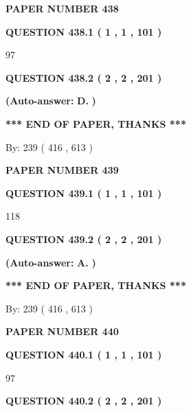 \documentclass[12pt]{article}
\begin{document}
   
\newpage 
\setcounter{page}{ 
   438001 } 
   
   
 {\textbf{ \Large{ PAPER NUMBER  438  }}}
   
   
   
   
  
  
{\textbf{\large{QUESTION
438.1 
 ( 1 , 1 , 101 )
}}}

97
  
  
{\textbf{\large{QUESTION
438.2 
 ( 2 , 2 , 201 )
}}}
 
 
{\textbf{(Auto-answer:}}
{\textbf{\large{
D.}}}
{\textbf{)}}
 
 
   
   
   
   
\vspace{1.0in} 
{\textbf{\large{ *** END OF PAPER, THANKS *** }}} 
   
   
\hspace{1.0in} By: 
 239 ( 416 ,  613 )
   
   
   
   
\newpage 
\setcounter{page}{ 
   439001 } 
   
   
 {\textbf{ \Large{ PAPER NUMBER  439  }}}
   
   
   
   
  
  
{\textbf{\large{QUESTION
439.1 
 ( 1 , 1 , 101 )
}}}

118
  
  
{\textbf{\large{QUESTION
439.2 
 ( 2 , 2 , 201 )
}}}
 
 
{\textbf{(Auto-answer:}}
{\textbf{\large{
A.}}}
{\textbf{)}}
 
 
   
   
   
   
\vspace{1.0in} 
{\textbf{\large{ *** END OF PAPER, THANKS *** }}} 
   
   
\hspace{1.0in} By: 
 239 ( 416 ,  613 )
   
   
   
   
\newpage 
\setcounter{page}{ 
   440001 } 
   
   
 {\textbf{ \Large{ PAPER NUMBER  440  }}}
   
   
   
   
  
  
{\textbf{\large{QUESTION
440.1 
 ( 1 , 1 , 101 )
}}}

97
  
  
{\textbf{\large{QUESTION
440.2 
 ( 2 , 2 , 201 )
}}}
 
\end{document}
